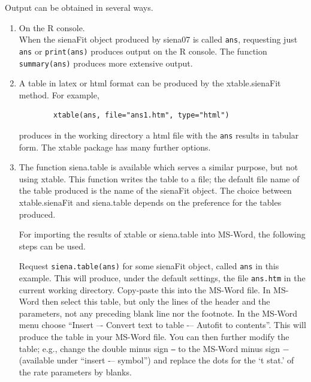 \documentclass[a4paper,fleqn,11pt]{article}
\newcommand{\+}{\, + \,}
\newcommand{\sfn}[1]{\textsf{#1}}
\newcommand{\R}{{\sf R }}
\begin{document}
Output can be obtained in several ways.
\begin{enumerate}
  \item On the \R console.\\
        When the \textsf{sienaFit} object produced by \textsf{siena07}
        is called \texttt{ans},
        requesting just \texttt{ans} or \texttt{print(ans)}
        produces output on the \R console. The function
        \texttt{summary(ans)} produces more extensive output.
  \item A table in latex or html format can be produced by the
        \textsf{xtable.sienaFit} method.
        For example,
        \begin{verbatim}
        xtable(ans, file="ans1.htm", type="html")
        \end{verbatim}
        produces in the working directory a html file with the \texttt{ans}
        results in
        tabular form. The \textsf{xtable} package has many further options.\\
  \item The function \sfn{siena.table}
        is available which serves a similar purpose,
        but not using \textsf{xtable}.
        This function writes the table to a file;
        the default file name of the table produced is the name of the
        \sfn{sienaFit} object.
        The choice between \textsf{xtable.sienaFit} and \sfn{siena.table}
        depends on the preference for the tables produced.

        For importing the results of \sfn{xtable} or \sfn{siena.table} into
        MS-Word, the following steps can be used.

        Request \texttt{siena.table(ans)} for some \sfn{sienaFit} object,
        called \texttt{ans} in this example. This will produce,
        under the default settings, the file \texttt{ans.htm} in the current
        working directory.
        Copy-paste this into the MS-Word file.
        In MS-Word then select this table, but
        only the lines of the header and the parameters, not any
        preceding blank line nor the footnote.
        In the MS-Word menu choose ``Insert –- Convert text to table -–
        Autofit to contents''.
        This will produce the table in your MS-Word file.
        You can then further modify the table; e.g., change the double minus
        sign \texttt{--} to the MS-Word minus sign $ - $
        (available under ``insert -– symbol'') and replace the dots for the
        `t stat.' of the rate parameters by blanks.


\end{enumerate}
\end{document}
